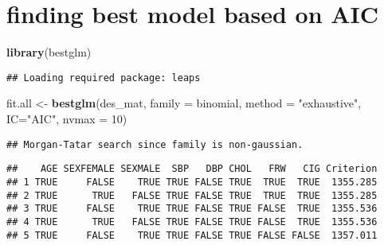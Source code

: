 \documentclass[]{article}
\newenvironment{Shaded}{\begin{snugshade}}{\end{snugshade}}
\newcommand{\KeywordTok}[1]{\textcolor[rgb]{0.13,0.29,0.53}{\textbf{#1}}}
\newcommand{\DataTypeTok}[1]{\textcolor[rgb]{0.13,0.29,0.53}{#1}}
\newcommand{\DecValTok}[1]{\textcolor[rgb]{0.00,0.00,0.81}{#1}}
\newcommand{\StringTok}[1]{\textcolor[rgb]{0.31,0.60,0.02}{#1}}
\newcommand{\OperatorTok}[1]{\textcolor[rgb]{0.81,0.36,0.00}{\textbf{#1}}}
\newcommand{\NormalTok}[1]{#1}
\begin{document}
\section{finding best model based on
AIC}\label{finding-best-model-based-on-aic}

\begin{Shaded}
\begin{Highlighting}[]
\KeywordTok{library}\NormalTok{(bestglm)}
\end{Highlighting}
\end{Shaded}

\begin{verbatim}
## Loading required package: leaps
\end{verbatim}

\begin{Shaded}
\begin{Highlighting}[]
\NormalTok{fit.all <-}\StringTok{ }\KeywordTok{bestglm}\NormalTok{(des_mat, }\DataTypeTok{family =}\NormalTok{ binomial, }\DataTypeTok{method =} \StringTok{"exhaustive"}\NormalTok{, }\DataTypeTok{IC=}\StringTok{"AIC"}\NormalTok{, }\DataTypeTok{nvmax =} \DecValTok{10}\NormalTok{) }
\end{Highlighting}
\end{Shaded}

\begin{verbatim}
## Morgan-Tatar search since family is non-gaussian.
\end{verbatim}

\begin{Shaded}
\end{Shaded}

\begin{verbatim}
##    AGE SEXFEMALE SEXMALE  SBP   DBP CHOL   FRW   CIG Criterion
## 1 TRUE     FALSE    TRUE TRUE FALSE TRUE  TRUE  TRUE  1355.285
## 2 TRUE      TRUE   FALSE TRUE FALSE TRUE  TRUE  TRUE  1355.285
## 3 TRUE     FALSE    TRUE TRUE FALSE TRUE FALSE  TRUE  1355.536
## 4 TRUE      TRUE   FALSE TRUE FALSE TRUE FALSE  TRUE  1355.536
## 5 TRUE     FALSE    TRUE TRUE FALSE TRUE FALSE FALSE  1357.011
\end{verbatim}

\begin{Shaded}
\end{Shaded}
\end{document}
